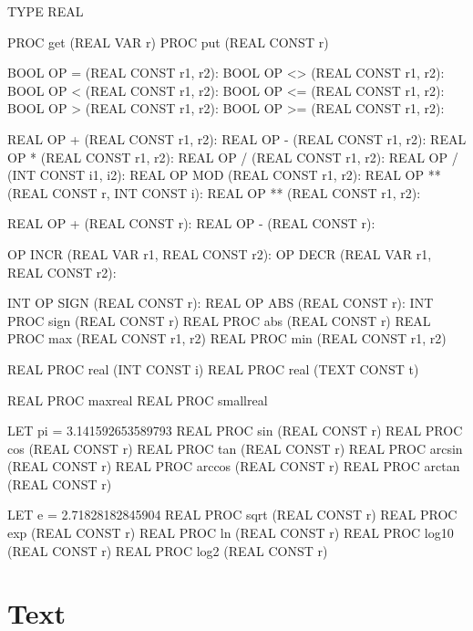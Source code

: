 \begin{elan}
TYPE REAL

PROC get (REAL VAR r)
PROC put (REAL CONST r)

BOOL OP = (REAL CONST r1, r2):
BOOL OP <> (REAL CONST r1, r2):
BOOL OP < (REAL CONST r1, r2):
BOOL OP <= (REAL CONST r1, r2):
BOOL OP > (REAL CONST r1, r2):
BOOL OP >= (REAL CONST r1, r2):

REAL OP + (REAL CONST r1, r2):
REAL OP - (REAL CONST r1, r2):
REAL OP * (REAL CONST r1, r2):
REAL OP / (REAL CONST r1, r2):
REAL OP / (INT CONST i1, i2):
REAL OP MOD (REAL CONST r1, r2):
REAL OP ** (REAL CONST r, INT CONST i):
REAL OP ** (REAL CONST r1, r2):

REAL OP + (REAL CONST r):
REAL OP - (REAL CONST r):

OP INCR (REAL VAR r1, REAL CONST r2):
OP DECR (REAL VAR r1, REAL CONST r2):

INT OP SIGN (REAL CONST r):
REAL OP ABS (REAL CONST r):
INT PROC sign (REAL CONST r)
REAL PROC abs (REAL CONST r)
REAL PROC max (REAL CONST r1, r2)
REAL PROC min (REAL CONST r1, r2)

REAL PROC real (INT CONST i)
REAL PROC real (TEXT CONST t)

REAL PROC maxreal
REAL PROC smallreal

LET pi = 3.141592653589793
REAL PROC sin (REAL CONST r)
REAL PROC cos (REAL CONST r)
REAL PROC tan (REAL CONST r)
REAL PROC arcsin (REAL CONST r)
REAL PROC arccos (REAL CONST r)
REAL PROC arctan (REAL CONST r)

LET e = 2.71828182845904
REAL PROC sqrt (REAL CONST r)
REAL PROC exp (REAL CONST r)
REAL PROC ln (REAL CONST r)
REAL PROC log10 (REAL CONST r)
REAL PROC log2 (REAL CONST r)
\end{elan}

\section{Text}

